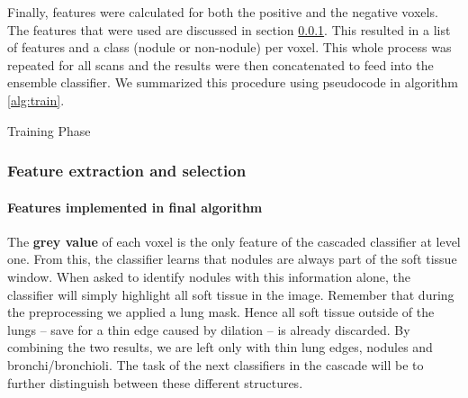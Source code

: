 Finally, features were calculated for both the positive and the negative voxels.
The features that were used are discussed in section \ref{sec:featureExtraction}.
This resulted in a list of features and a class (nodule or non-nodule) per
voxel. This whole process was repeated for all scans and the results were then
concatenated to feed into the ensemble classifier. We summarized
this procedure using pseudocode in algorithm \ref{alg:train}.

\begin{algorithm}[ht]
	\DontPrintSemicolon
	\caption{Training Phase\label{alg:train}}
\end{algorithm}

\subsubsection{Feature extraction and selection} \label{sec:featureExtraction}
\paragraph{Features implemented in final algorithm}
The \textbf{grey value} of each voxel is the only feature of the cascaded
classifier at level one. From this, the classifier learns that nodules are
always part of the soft tissue window. When asked to identify nodules with this
information alone, the classifier will simply highlight all soft tissue in the
image. Remember that during the preprocessing we applied a lung mask. Hence all
soft tissue outside of the lungs -- save for a thin edge caused by dilation --
is already discarded. By combining the two results, we are left only with thin
lung edges, nodules and bronchi/bronchioli. The task of the next classifiers in
the cascade will be to further distinguish between these different structures.

